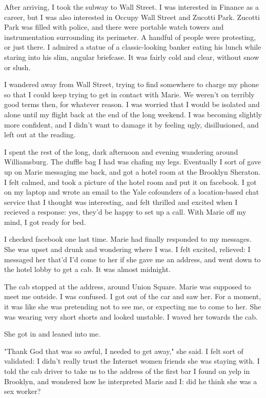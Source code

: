 \documentclass[12pt]{article}
\begin{document}
After arriving, I took the subway to Wall Street.  I was interested in Finance
as a career, but I was also interested in Occupy Wall Street and Zucotti Park.
Zucotti Park was filled with police, and there were portable watch towers and
instrumentation surrounding its perimeter.  A handful of people were protesting,
or just there.  I admired a statue of a classic-looking banker eating his lunch
while staring into his slim, angular briefcase.  It was fairly cold and clear,
without snow or slush.

I wandered away from Wall Street, trying to find somewhere to charge my phone so
that I could keep trying to get in contact with Marie.  We weren't on terribly
good terms then, for whatever reason.  I was worried that I would be isolated
and alone until my flight back at the end of the long weekend.  I was becoming
slightly more confident, and I didn't want to damage it by feeling ugly,
disillusioned, and left out at the reading.

I spent the rest of the long, dark afternoon and evening wandering around
Williamsburg.  The duffle bag I had was chafing my legs.  Eventually I sort
of gave up on Marie messaging me back, and got a hotel room at the Brooklyn
Sheraton.  I felt calmed, and took a picture of the hotel room and put it on
facebook.  I got on my laptop and wrote an email to the Yale cofounders of a
location-based chat service that I thought was interesting, and felt thrilled
and excited when I recieved a response: yes, they'd be happy to set up a call.
With Marie off my mind, I got ready for bed.  

I checked facebook one last time.  Marie had finally responded to my messages.
She was upset and drunk and wondering where I was.  I felt excited, relieved: I
messaged her that'd I'd come to her if she gave me an address, and went down to
the hotel lobby to get a cab.  It was almost midnight.

The cab stopped at the address, around Union Square.  Marie was supposed to meet
me outside. I was confused.  I got out of the car and saw her.  For a moment, it
was like she was pretending not to see me, or expecting me to come to her.  She
was wearing very short shorts and looked unstable.  I waved her towards the cab.  

She got in and leaned into me.

"Thank God that was so awful, I needed to get away," she said.  I felt sort of
validated: I didn't really trust the Internet women friends she was staying
with.  I told the cab driver to take us to the address of the first bar I found
on yelp in Brooklyn, and wondered how he interpreted Marie and I: did he think
she was a sex worker?  
\end{document}
